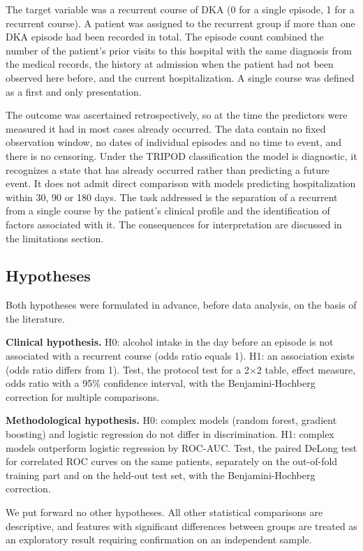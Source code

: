 \documentclass[pdflatex,sn-basic,Numbered]{sn-jnl}
\begin{document}
The target variable was a recurrent course of DKA (0 for a single episode, 1 for a recurrent course). A patient was assigned to the recurrent group if more than one DKA episode had been recorded in total. The episode count combined the number of the patient's prior visits to this hospital with the same diagnosis from the medical records, the history at admission when the patient had not been observed here before, and the current hospitalization. A single course was defined as a first and only presentation.

The outcome was ascertained retrospectively, so at the time the predictors were measured it had in most cases already occurred. The data contain no fixed observation window, no dates of individual episodes and no time to event, and there is no censoring. Under the TRIPOD classification the model is diagnostic, it recognizes a state that has already occurred rather than predicting a future event. It does not admit direct comparison with models predicting hospitalization within 30, 90 or 180 days. The task addressed is the separation of a recurrent from a single course by the patient's clinical profile and the identification of factors associated with it. The consequences for interpretation are discussed in the limitations section.

\subsection{Hypotheses}\label{subsec2_3}

Both hypotheses were formulated in advance, before data analysis, on the basis of the literature.

\textbf{Clinical hypothesis.} H0: alcohol intake in the day before an episode is not associated with a recurrent course (odds ratio equals 1). H1: an association exists (odds ratio differs from 1). Test, the protocol test for a 2$\times$2 table, effect measure, odds ratio with a 95\% confidence interval, with the Benjamini-Hochberg correction for multiple comparisons.

\textbf{Methodological hypothesis.} H0: complex models (random forest, gradient boosting) and logistic regression do not differ in discrimination. H1: complex models outperform logistic regression by ROC-AUC. Test, the paired DeLong test for correlated ROC curves on the same patients, separately on the out-of-fold training part and on the held-out test set, with the Benjamini-Hochberg correction.

We put forward no other hypotheses. All other statistical comparisons are descriptive, and features with significant differences between groups are treated as an exploratory result requiring confirmation on an independent sample.
\end{document}
